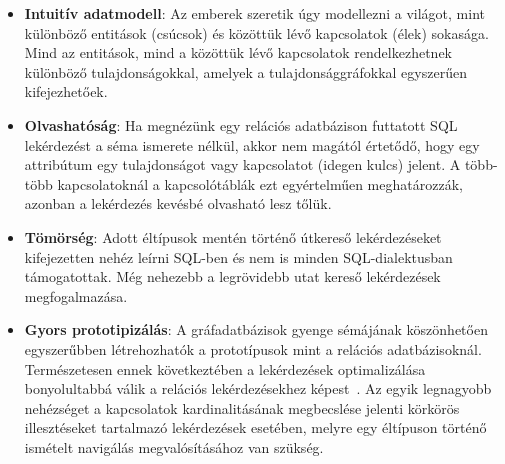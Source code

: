\begin{itemize}	
	\item \textbf{Intuitív adatmodell}: Az emberek szeretik úgy modellezni a világot, mint különböző entitások (csúcsok) és közöttük lévő kapcsolatok (élek) sokasága. Mind az entitások, mind a közöttük lévő kapcsolatok rendelkezhetnek különböző tulajdonságokkal, amelyek a tulajdonsággráfokkal egyszerűen kifejezhetőek.
	\item \textbf{Olvashatóság}: Ha megnézünk egy relációs adatbázison futtatott SQL  lekérdezést a séma ismerete nélkül, akkor nem magától értetődő, hogy egy attribútum egy tulajdonságot vagy kapcsolatot (idegen kulcs) jelent. A több-több kapcsolatoknál a kapcsolótáblák ezt egyértelműen meghatározzák, azonban a lekérdezés kevésbé olvasható lesz tőlük.
	\item \textbf{Tömörség}: Adott éltípusok mentén történő útkereső lekérdezéseket kifejezetten nehéz leírni SQL-ben és nem is minden SQL-dialektusban támogatottak. Még nehezebb a legrövidebb utat kereső lekérdezések megfogalmazása.
	\item \textbf{Gyors prototipizálás}: A gráfadatbázisok gyenge sémájának köszönhetően egyszerűbben létrehozhatók a prototípusok mint a relációs adatbázisoknál. Természetesen ennek következtében a lekérdezések optimalizálása bonyolultabbá válik a relációs lekérdezésekhez képest~\cite{DBLP:conf/cikm/SakrEH12}. Az egyik legnagyobb nehézséget a kapcsolatok kardinalitásának megbecslése jelenti körkörös illesztéseket tartalmazó lekérdezések esetében, melyre egy éltípuson történő ismételt navigálás megvalósításához van szükség. 
\end{itemize}

